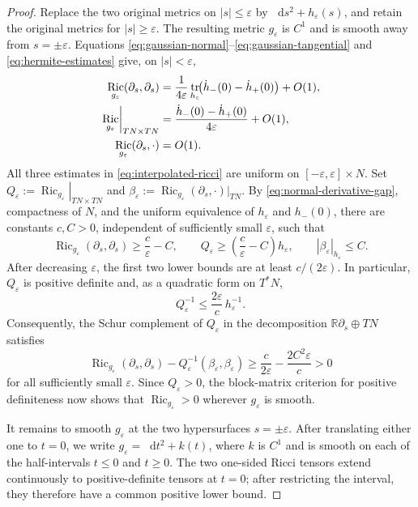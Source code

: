 \documentclass[11pt,reqno]{amsart}
\theoremstyle{definition}
\numberwithin{equation}{section}
\DeclareMathOperator{\Ric}{Ric}
\DeclareMathOperator{\tr}{tr}
\newcommand{\dd}{\mathop{}\!\mathrm d}
\begin{document}
\begin{proof}
Replace the two original metrics on $|s|\le\varepsilon$ by
$\dd s^2+h_\varepsilon(s)$, and retain the original metrics for
$|s|\ge\varepsilon$.  The resulting metric $g_\varepsilon$ is $C^1$
and is smooth away from $s=\pm\varepsilon$.  Equations
\eqref{eq:gaussian-normal}--\eqref{eq:gaussian-tangential} and
\eqref{eq:hermite-estimates} give, on $|s|<\varepsilon$,
\begin{align}
 \Ric_{g_\varepsilon}(\partial_s,\partial_s)
  &=\frac{1}{4\varepsilon}
    \tr_{h_\varepsilon}\!\bigl(\dot h_-(0)-\dot h_+(0)\bigr)+O(1),
    \notag\\
 \left.\Ric_{g_\varepsilon}\right|_{TN\times TN}
  &=\frac{\dot h_-(0)-\dot h_+(0)}{4\varepsilon}+O(1),
    \label{eq:interpolated-ricci}\\
 \Ric_{g_\varepsilon}(\partial_s,\cdot)&=O(1).\notag
\end{align}
All three estimates in \eqref{eq:interpolated-ricci} are uniform on $[-\varepsilon,\varepsilon]\times N$.
Set $Q_\varepsilon:=\left.\Ric_{g_\varepsilon}\right|_{TN\times TN}$ and
$\beta_\varepsilon:=\Ric_{g_\varepsilon}(\partial_s,\mathord\cdot)|_{TN}$.
By \eqref{eq:normal-derivative-gap}, compactness of $N$, and the uniform
equivalence of $h_\varepsilon$ and $h_-(0)$, there are constants $c,C>0$,
independent of sufficiently small $\varepsilon$, such that
\[
 \Ric_{g_\varepsilon}(\partial_s,\partial_s)
    \ge \frac{c}{\varepsilon}-C,
 \qquad
 Q_\varepsilon\ge\left(\frac{c}{\varepsilon}-C\right)h_\varepsilon,
 \qquad
 |\beta_\varepsilon|_{h_\varepsilon}\le C.
\]
After decreasing $\varepsilon$, the first two lower bounds are at least
$c/(2\varepsilon)$.  In particular, $Q_\varepsilon$ is positive definite
and, as a quadratic form on $T^*N$,
\[
 Q_\varepsilon^{-1}\le \frac{2\varepsilon}{c}\,h_\varepsilon^{-1}.
\]
Consequently, the Schur complement of $Q_\varepsilon$ in the decomposition
$\mathbb R\partial_s\oplus TN$ satisfies
\[
 \Ric_{g_\varepsilon}(\partial_s,\partial_s)
 -Q_\varepsilon^{-1}(\beta_\varepsilon,\beta_\varepsilon)
 \ge \frac{c}{2\varepsilon}-\frac{2C^2\varepsilon}{c}>0
\]
for all sufficiently small $\varepsilon$.  Since $Q_\varepsilon>0$, the
block-matrix criterion for positive definiteness now shows that
$\Ric_{g_\varepsilon}>0$ wherever $g_\varepsilon$ is smooth.

It remains to smooth $g_\varepsilon$ at the two hypersurfaces
$s=\pm\varepsilon$.  After translating either one to $t=0$, we write
$g_\varepsilon=\dd t^2+k(t)$, where $k$ is $C^1$ and is smooth on each
of the half-intervals $t\le0$ and $t\ge0$.  The two one-sided Ricci
tensors extend continuously to positive-definite tensors at $t=0$;
after restricting the interval, they therefore have a common positive
lower bound.


\end{proof}
\end{document}
